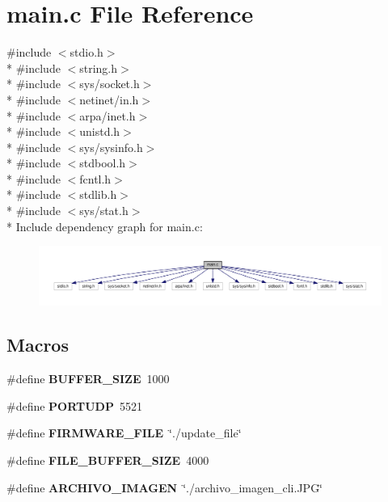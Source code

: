\section{main.\+c File Reference}
\label{main_8c}
{\ttfamily \#include $<$stdio.\+h$>$}\\*
{\ttfamily \#include $<$string.\+h$>$}\\*
{\ttfamily \#include $<$sys/socket.\+h$>$}\\*
{\ttfamily \#include $<$netinet/in.\+h$>$}\\*
{\ttfamily \#include $<$arpa/inet.\+h$>$}\\*
{\ttfamily \#include $<$unistd.\+h$>$}\\*
{\ttfamily \#include $<$sys/sysinfo.\+h$>$}\\*
{\ttfamily \#include $<$stdbool.\+h$>$}\\*
{\ttfamily \#include $<$fcntl.\+h$>$}\\*
{\ttfamily \#include $<$stdlib.\+h$>$}\\*
{\ttfamily \#include $<$sys/stat.\+h$>$}\\*
Include dependency graph for main.\+c\+:\nopagebreak
\begin{figure}[H]
\begin{center}
\leavevmode
\includegraphics[width=350pt]{main_8c__incl}
\end{center}
\end{figure}
\subsection*{Macros}
\begin{DoxyCompactItemize}
\item 
\#define {\bf B\+U\+F\+F\+E\+R\+\_\+\+S\+I\+ZE}~1000
\item 
\#define {\bf P\+O\+R\+T\+U\+DP}~5521
\item 
\#define {\bf F\+I\+R\+M\+W\+A\+R\+E\+\_\+\+F\+I\+LE}~\char`\"{}./update\+\_\+file\char`\"{}
\item 
\#define {\bf F\+I\+L\+E\+\_\+\+B\+U\+F\+F\+E\+R\+\_\+\+S\+I\+ZE}~4000
\item 
\#define {\bf A\+R\+C\+H\+I\+V\+O\+\_\+\+I\+M\+A\+G\+EN}~\char`\"{}./archivo\+\_\+imagen\+\_\+cli.\+J\+PG\char`\"{}
\end{DoxyCompactItemize}
